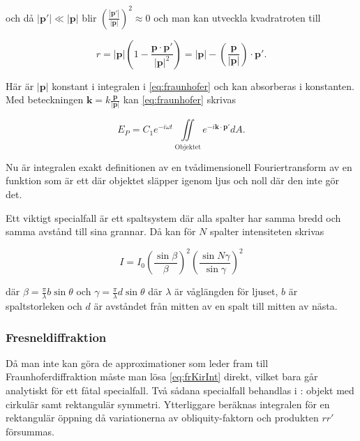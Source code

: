 \documentclass[a4paper]{article}
\begin{document}
och då $|\boldsymbol{p'}|\ll|\boldsymbol{p}|$ blir $\left(\frac{|\boldsymbol{p'}|}{|\boldsymbol{p}|}\right)^2\approx 0$ och man kan utveckla kvadratroten till

\begin{equation}
	r = |\boldsymbol{p}|\left( 1 - \frac{\boldsymbol{p}\cdot\boldsymbol{p'}}{|\boldsymbol{p}|^2} \right) = |\boldsymbol{p}| - \left(\frac{\boldsymbol{p}}{|\boldsymbol{p}|}\right)\cdot\boldsymbol{p'}\text{.}
\end{equation}

Här är $|\boldsymbol{p}|$ konstant i integralen i \eqref{eq:fraunhofer} och kan absorberas i konstanten. Med beteckningen $\boldsymbol{k} = k \frac{\boldsymbol{p}}{|\boldsymbol{p}|}$ kan \eqref{eq:fraunhofer} skrivas

\begin{equation}
	E_P = C_1 e^{-i \omega t} \iint\limits_{\mathrm{Objektet}} {e^{-i \boldsymbol{k}\cdot\boldsymbol{p'}} dA}\text{.}
	\label{eq:fraunFT}
\end{equation}

Nu är integralen exakt definitionen av en tvådimensionell Fouriertransform av en funktion som är ett där objektet släpper igenom ljus och noll där den inte gör det.

Ett viktigt specialfall är ett spaltsystem där alla spalter har samma bredd och samma avstånd till sina grannar. Då kan för $N$ spalter intensiteten skrivas \cite[p.~301]{pearsonIntroOpt} \cite{labManual}

\begin{equation}
	I = I_0 \left(\frac{\sin\beta}{\beta}\right)^2 \left(\frac{\sin N\gamma}{\sin\gamma}\right)^2
	\label{eq:diffGrating}
\end{equation}

där $\beta = \frac{\pi}{\lambda} b \sin\theta$ och $\gamma = \frac{\pi}{\lambda} d \sin\theta$ där $\lambda$ är våglängden för ljuset, $b$ är spaltstorleken och $d$ är avståndet från mitten av en spalt till mitten av nästa.

\subsubsection{Fresneldiffraktion}

Då man inte kan göra de approximationer som leder fram till Fraunhoferdiffraktion måste man lösa \eqref{eq:frKirInt} direkt, vilket bara går analytiskt för ett fåtal specialfall. Två sådana specialfall behandlas i \cite{pearsonIntroOpt}: objekt med cirkulär samt rektangulär symmetri. Ytterliggare beräknas integralen för en rektangulär öppning då variationerna av obliquity-faktorn och produkten $r r'$ försummas.
\end{document}
